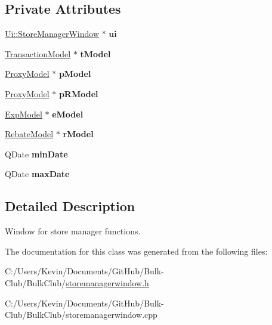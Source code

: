 \subsection*{Private Attributes}
\begin{DoxyCompactItemize}
\item 
\mbox{\label{class_store_manager_window_a596fc73c1fc56624c21f6f7d81e01936}} 
\mbox{\hyperlink{class_ui_1_1_store_manager_window}{Ui\+::\+Store\+Manager\+Window}} $\ast$ {\bfseries ui}
\item 
\mbox{\label{class_store_manager_window_afbc1698669bc998de14e99142db57928}} 
\mbox{\hyperlink{class_transaction_model}{Transaction\+Model}} $\ast$ {\bfseries t\+Model}
\item 
\mbox{\label{class_store_manager_window_ac62e0896040e5385846e6aebaa2125ee}} 
\mbox{\hyperlink{class_proxy_model}{Proxy\+Model}} $\ast$ {\bfseries p\+Model}
\item 
\mbox{\label{class_store_manager_window_a9e591b8ec81a3d9a38f7a1823f8bca89}} 
\mbox{\hyperlink{class_proxy_model}{Proxy\+Model}} $\ast$ {\bfseries p\+R\+Model}
\item 
\mbox{\label{class_store_manager_window_a3849500e7e9bdbc8da89ffb5f10045ec}} 
\mbox{\hyperlink{class_exp_model}{Exp\+Model}} $\ast$ {\bfseries e\+Model}
\item 
\mbox{\label{class_store_manager_window_ab22793ed2b8d3e6a7df8898be6999b1e}} 
\mbox{\hyperlink{class_rebate_model}{Rebate\+Model}} $\ast$ {\bfseries r\+Model}
\item 
\mbox{\label{class_store_manager_window_adb9d61e467eb2493af3dffb00160481f}} 
Q\+Date {\bfseries min\+Date}
\item 
\mbox{\label{class_store_manager_window_a1a2a497dc32a91da4459467315de6b31}} 
Q\+Date {\bfseries max\+Date}
\end{DoxyCompactItemize}


\subsection{Detailed Description}
Window for store manager functions. 

The documentation for this class was generated from the following files\+:\begin{DoxyCompactItemize}
\item 
C\+:/\+Users/\+Kevin/\+Documents/\+Git\+Hub/\+Bulk-\/\+Club/\+Bulk\+Club/\mbox{\hyperlink{storemanagerwindow_8h}{storemanagerwindow.\+h}}\item 
C\+:/\+Users/\+Kevin/\+Documents/\+Git\+Hub/\+Bulk-\/\+Club/\+Bulk\+Club/storemanagerwindow.\+cpp\end{DoxyCompactItemize}
